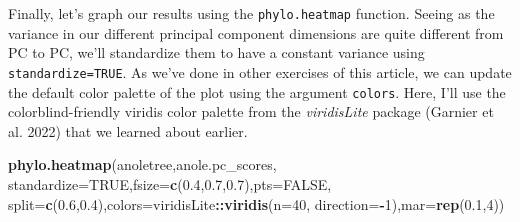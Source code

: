 \documentclass[fleqn,10pt,lineno]{wlpeerj} %
\newenvironment{Shaded}{\begin{snugshade}}{\end{snugshade}}
\newcommand{\AttributeTok}[1]{\textcolor[rgb]{0.13,0.29,0.53}{#1}}
\newcommand{\ConstantTok}[1]{\textcolor[rgb]{0.56,0.35,0.01}{#1}}
\newcommand{\DecValTok}[1]{\textcolor[rgb]{0.00,0.00,0.81}{#1}}
\newcommand{\FloatTok}[1]{\textcolor[rgb]{0.00,0.00,0.81}{#1}}
\newcommand{\FunctionTok}[1]{\textcolor[rgb]{0.13,0.29,0.53}{\textbf{#1}}}
\newcommand{\NormalTok}[1]{#1}
\newcommand{\SpecialCharTok}[1]{\textcolor[rgb]{0.81,0.36,0.00}{\textbf{#1}}}
\begin{document}
Finally, let's graph our results using the \texttt{phylo.heatmap} function. Seeing as the variance in our different principal component dimensions are quite different from PC to PC, we'll standardize them to have a constant variance using \texttt{standardize=TRUE}. As we've done in other exercises of this article, we can update the default color palette of the plot using the argument \texttt{colors}. Here, I'll use the colorblind-friendly viridis color palette from the \emph{viridisLite} package (Garnier et al. 2022) that we learned about earlier.

\begin{Shaded}
\begin{Highlighting}[]
\FunctionTok{phylo.heatmap}\NormalTok{(anoletree,anole.pc\_scores,}
  \AttributeTok{standardize=}\ConstantTok{TRUE}\NormalTok{,}\AttributeTok{fsize=}\FunctionTok{c}\NormalTok{(}\FloatTok{0.4}\NormalTok{,}\FloatTok{0.7}\NormalTok{,}\FloatTok{0.7}\NormalTok{),}\AttributeTok{pts=}\ConstantTok{FALSE}\NormalTok{,}
  \AttributeTok{split=}\FunctionTok{c}\NormalTok{(}\FloatTok{0.6}\NormalTok{,}\FloatTok{0.4}\NormalTok{),}\AttributeTok{colors=}\NormalTok{viridisLite}\SpecialCharTok{::}\FunctionTok{viridis}\NormalTok{(}\AttributeTok{n=}\DecValTok{40}\NormalTok{,}
  \AttributeTok{direction=}\SpecialCharTok{{-}}\DecValTok{1}\NormalTok{),}\AttributeTok{mar=}\FunctionTok{rep}\NormalTok{(}\FloatTok{0.1}\NormalTok{,}\DecValTok{4}\NormalTok{))}
\end{Highlighting}
\end{Shaded}
\end{document}
